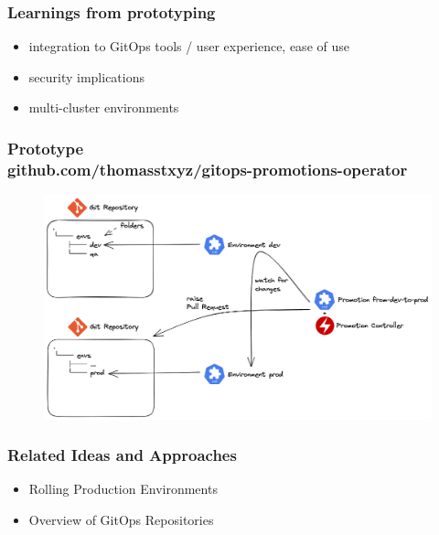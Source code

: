 \documentclass{beamer}
\begin{document}
\begin{frame}
	\frametitle{Learnings from prototyping}
	
	\begin{itemize}
		\item integration to GitOps tools / user experience, ease of use
		\item security implications
		\item multi-cluster environments
	\end{itemize}
	
\end{frame}

\begin{frame}
	\frametitle{Prototype \\ github.com/thomasstxyz/gitops-promotions-operator}
	
	\begin{figure}[h]
		\centering
		\includegraphics[width=1.0\linewidth]{assets/architecture-controller-crd.png}
		\label{fig:architecture-controller-crd}	
	\end{figure}
	
\end{frame}
%	
%	

\begin{frame}
\frametitle{Related Ideas and Approaches}

\begin{itemize}
	\item Rolling Production Environments
	\item Overview of GitOps Repositories
\end{itemize}

\end{frame}
\end{document}
